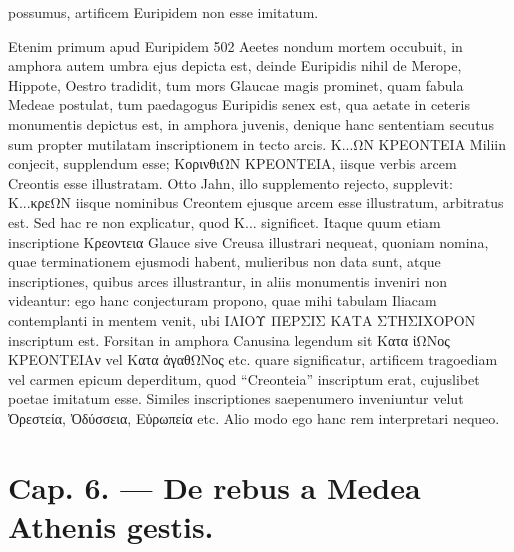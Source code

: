 \documentclass[a4paper, 11pt, oneside, polutonikogreek, german]{article}
\begin{document}
possumus, artificem Euripidem non esse imitatum.

Etenim primum apud Euripidem 502 Aeetes nondum mortem occubuit, in amphora autem umbra ejus depicta est, deinde Euripidis nihil de Merope, Hippote, Oestro tradidit, tum mors Glaucae magis prominet, quam fabula Medeae postulat, tum paedagogus Euripidis senex est, qua aetate in ceteris monumentis depictus est, in amphora juvenis, denique hanc sententiam secutus sum propter mutilatam inscriptionem in tecto arcis. Κ...ΩΝ ΚΡΕΟΝΤΕΙΑ Miliin conjecit, supplendum esse; ΚορινθιΩΝ ΚΡΕΟΝΤΕΙΑ, iisque verbis arcem Creontis esse illustratam. Otto Jahn, illo supplemento rejecto, supplevit: Κ...κρεΩΝ iisque nominibus Creontem ejusque arcem esse illustratum, arbitratus est. Sed hac re non explicatur, quod Κ... significet. Itaque quum etiam inscriptione Κρεοντεια Glauce sive Creusa illustrari nequeat, quoniam nomina, quae terminationem ejusmodi habent, mulieribus non data sunt, atque inscriptiones, quibus arces illustrantur, in aliis monumentis inveniri non videantur: ego hanc conjecturam propono, quae mihi tabulam Iliacam contemplanti in mentem venit, ubi ΙΛΙΟΥ ΠΕΡΣΙΣ ΚΑΤΑ ΣΤΗΣΙΧΟΡΟΝ inscriptum est. Forsitan in amphora Canusina legendum sit Κατα ἰΩΝος ΚΡΕΟΝΤΕΙΑν vel Κατα ἀγαθΩΝος etc. quare significatur, artificem tragoediam vel carmen epicum deperditum, quod "`Creonteia"' inscriptum erat, cujuslibet poetae imitatum esse. Similes inscriptiones saepenumero inveniuntur velut Ὀρεστεία, Ὀδύσσεια, Εὐρωπεία etc. Alio modo ego hanc rem interpretari nequeo.
\clearpage
\section{Cap. 6. --- De rebus a Medea Athenis gestis.}
\end{document}

